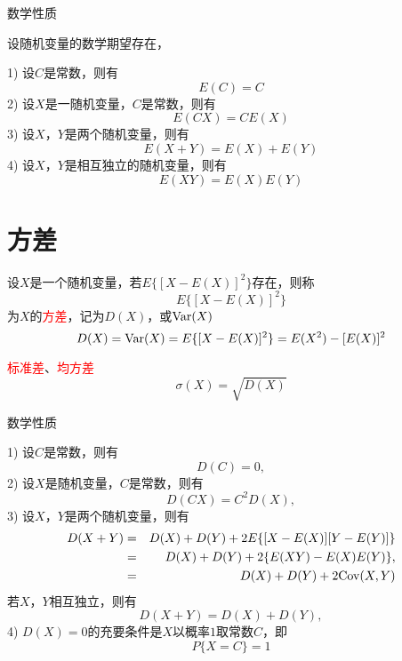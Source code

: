 \documentclass[12pt,a4paper]{article}
\begin{document}
数学性质

设随机变量的数学期望存在，

1) 设$C$是常数，则有
\begin{equation}
E(C) = C
\end{equation}
2) 设$X$是一随机变量，$C$是常数，则有
\begin{equation}
E(CX) = C E(X)
\end{equation}
3) 设$X$，$Y$是两个随机变量，则有
\begin{equation}
E(X+Y) = E(X) + E(Y)
\end{equation}
4) 设$X$，$Y$是相互独立的随机变量，则有
\begin{equation}
E(XY) = E(X)E(Y)
\end{equation}

\section{方差}
设$X$是一个随机变量，若$E\{[X -E(X)]^2\}$存在，则称
\begin{equation*}
E\{[X -E(X)]^2\}
\end{equation*}
为$X$的\textcolor{red}{方差}，记为$D(X)$，或${\rm Var}(X)$
\begin{equation}
D(X) = {\rm Var}(X) = E\{[X -E(X)]^2\} = E(X^2) -[E(X)]^2
\end{equation}

\textcolor{red}{标准差}、\textcolor{red}{均方差}
\begin{equation}
\sigma(X) = \sqrt{D(X)}
\end{equation}

数学性质

1) 设$C$是常数，则有
\begin{equation}
D(C) = 0,
\end{equation}
2) 设$X$是随机变量，$C$是常数，则有
\begin{equation}
D(CX) = C^2 D(X),
\end{equation}
3) 设$X$，$Y$是两个随机变量，则有
\begin{eqnarray}
\nonumber D(X+Y) &=& D(X) + D(Y) +2E\{[X-E(X)][Y-E(Y)]\} \\
\nonumber &=& D(X) + D(Y) +2\{E(XY) -E(X)E(Y) \}, \\
 &=& D(X) + D(Y) +2{\rm Cov}(X, Y)
\end{eqnarray}
若$X$，$Y$相互独立，则有
\begin{equation}
D(X+Y) = D(X) + D(Y),
\end{equation}
4) $D(X)=0$的充要条件是$X$以概率$1$取常数$C$，即
\begin{equation}
P\{X =C\} =1
\end{equation}
\end{document}
